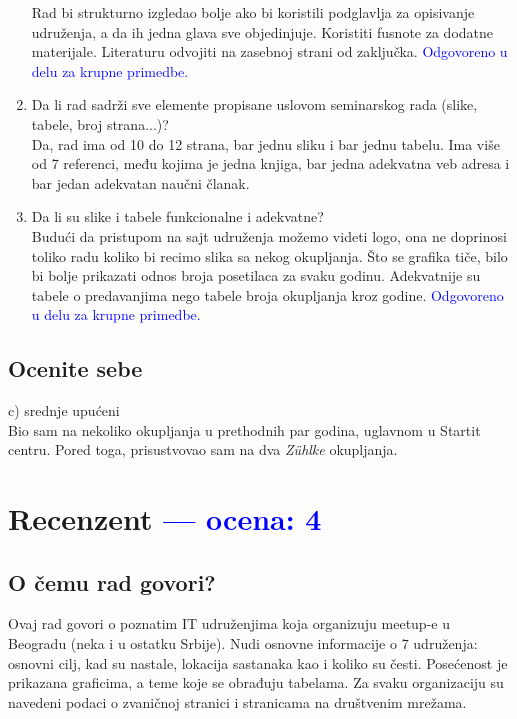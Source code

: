 \documentclass[a4paper]{report}
\newcommand{\odgovor}[1]{\textcolor{blue}{#1}}
\begin{document}
\begin{enumerate}
Rad bi strukturno izgledao bolje ako bi koristili podglavlja za opisivanje udruženja,
a da ih jedna glava sve objedinjuje. Koristiti fusnote za dodatne materijale.
Literaturu odvojiti na zasebnoj strani od zaključka.
\odgovor{Odgovoreno u delu za krupne primedbe.}
\item Da li rad sadrži sve elemente propisane uslovom seminarskog rada (slike, tabele, broj strana...)?\\
Da, rad ima od 10 do 12 strana, bar jednu sliku i bar jednu tabelu. Ima više od 7 referenci,
među kojima je jedna knjiga, bar jedna adekvatna veb adresa i bar jedan adekvatan naučni članak.
\item Da li su slike i tabele funkcionalne i adekvatne?\\
Budući da pristupom na sajt udruženja možemo videti logo, ona ne doprinosi toliko radu koliko bi recimo
slika sa nekog okupljanja. Što se grafika tiče, bilo bi bolje prikazati odnos broja posetilaca za svaku 
godinu. Adekvatnije su tabele o predavanjima nego tabele broja okupljanja kroz godine.
\odgovor{Odgovoreno u delu za krupne primedbe.}
\end{enumerate}

\section{Ocenite sebe}
c) srednje upućeni\\
Bio sam na nekoliko okupljanja u prethodnih par godina, uglavnom
u Startit centru. Pored toga, prisustvovao sam na dva \textit{Zühlke} okupljanja.  


\chapter{Recenzent \odgovor{--- ocena: 4} }


\section{O čemu rad govori?}
Ovaj rad govori o poznatim IT udruženjima koja organizuju meetup-e u Beogradu (neka i u ostatku Srbije). Nudi osnovne informacije o 7 udruženja: osnovni cilj, kad su nastale, lokacija sastanaka kao i koliko su česti. Posećenost je prikazana graficima, a teme koje se obrađuju tabelama. Za svaku organizaciju su navedeni podaci o zvaničnoj stranici i stranicama na društvenim mrežama.
\end{document}
